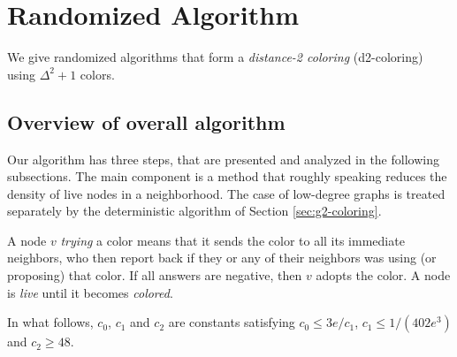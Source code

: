 \section{Randomized Algorithm}
\label{sec:randAlg}
We give randomized {\congest} algorithms that form a \emph{distance-2 coloring} (d2-coloring) using $\Delta^2+1$ colors.

\subsection{Overview of overall algorithm }

Our algorithm has three steps, that are presented and analyzed in the following subsections.
The main component is a method  that roughly speaking reduces the density of live nodes in a neighborhood. The case of low-degree graphs is treated separately by the deterministic algorithm of Section \ref{sec:g2-coloring}.

A node $v$ \emph{trying} a color means that it sends the color to all its immediate neighbors, who then report back if they or any of their neighbors was using (or proposing) that color.
If all answers are negative, then $v$ adopts the color. A node is \emph{live} until it becomes \emph{colored}.

In what follows, $c_0$, $c_1$ and $c_2$ are constants satisfying $c_0 \le 3e/c_1$, $c_1 \le 1/(402 e^3)$ and $c_2 \ge 48$.

